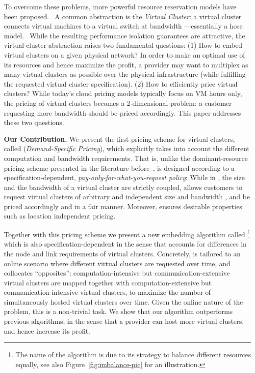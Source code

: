 \documentclass{sig-alternate-per}
\begin{document}
To overcome these problems, more powerful resource reservation models have been proposed.~\cite{short-ballani2011towards}
A common abstraction is the \emph{Virtual Cluster}: a virtual cluster  connects
 virtual machines to a virtual switch at bandwidth ---essentially a hose model.~\cite{short-talk-about}
While the resulting performance isolation guarantees are attractive, the virtual cluster abstraction
raises two fundamental questions: (1) How to embed virtual clusters on a given physical network? In order to
make an optimal use of its resources and hence maximize the profit, a provider may want to multiplex as
many virtual clusters as possible over the physical infrastructure (while fulfilling the requested virtual
cluster specification). (2) How to efficiently price virtual clusters?
While today's cloud pricing models typically focus on VM hours only, the pricing of virtual clusters becomes
a 2-dimensional problem: a customer requesting more bandwidth should be priced accordingly.
This paper addresses these two questions.

\textbf{Our Contribution.} We present the first pricing scheme for virtual clusters, called  (\emph{Demand-Specific Pricing}),
which explicitly takes into account the different computation and bandwidth requirements. That is, unlike
the dominant-resource pricing scheme  presented in the literature before~\cite{short-ballani2011price},
 is designed according to a specification-dependent, \emph{pay-only-for-what-you-request policy}:
While in , the size  and the bandwidth  of a virtual cluster are strictly coupled,
 allows customers to request virtual clusters  of
arbitrary and independent size  and bandwidth , and be priced accordingly and in a fair manner.
Moreover,  ensures desirable properties such as location independent pricing.

Together with this pricing scheme we present a new embedding algorithm called \footnote{The
name of the algorithm is due to its strategy to balance different resources equally, see also Figure~\ref{fig:imbalance-pic}
for an illustration.} which
is also specification-dependent in the sense that  accounts for differences in the node and link requirements of virtual clusters.
Concretely,  is tailored to an online scenario where different virtual clusters  are
requested over time, and collocates ``opposites'': computation-intensive but
communication-extensive virtual clusters are mapped together with
computation-extensive but communication-intensive virtual clusters, to maximize the number of simultaneously hosted
virtual clusters over time.
Given the online nature of the problem, this is a non-trivial task.
We show that our algorithm outperforms previous algorithms, in the sense that
a provider can host more virtual clusters, and hence increase its profit.
\end{document}
